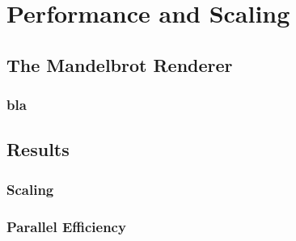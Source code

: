 \documentclass{beamer}
\begin{document}
\section{Performance and Scaling}

\subsection{The Mandelbrot Renderer} %
\begin{frame}
    \frametitle{bla}
\end{frame}

\subsection{Results}

\begin{frame}
    \frametitle{Scaling}
\end{frame}

\begin{frame}
    \frametitle{Parallel Efficiency}
\end{frame}
\end{document}
